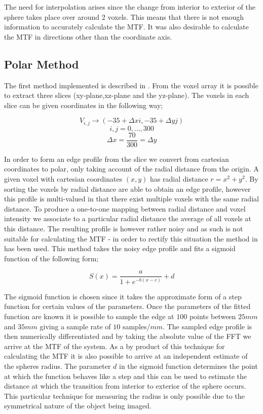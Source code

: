 \documentclass[
  twoside,
  11pt, a4paper,
  footinclude=true,
  headinclude=true,
  cleardoublepage=empty
]{scrbook}
\begin{document}
The need for interpolation arises since the change from interior to exterior of the sphere takes place over around 2 voxels. This means that there is not enough information to accurately calculate the MTF. It was also desirable to calculate the MTF in directions other than the coordinate axis.

\subsection{Polar Method}
The first method implemented is described in \cite{Friedman2013}. From the voxel array it is possible to extract three slices (xy-plane,xz-plane and the yz-plane). The voxels in each slice can be given coordinates in the following way;

\[
V_{i,j} \rightarrow (-35+\Delta x i,-35+\Delta y j)
\]
\[
i,j = 0,\dots,300
\]
\[
\Delta x = \frac{70}{300} = \Delta y
\]

In order to form an edge profile from the slice we convert from cartesian coordinates to polar, only taking account of the radial distance from the origin. A given voxel with cartesian coordinates $(x,y)$ has radial distance $r = x^2 + y^2$. By sorting the voxels by radial distance are able to obtain an edge profile, however this profile is multi-valued in that there exist multiple voxels with the same radial distance. To produce a one-to-one mapping between radial distance and voxel intensity we associate to a particular radial distance the average of all voxels at this distance. The resulting profile is however rather noisy and as such is not suitable for calculating the MTF - in order to rectify this situation the method in \cite{Takenaga2014} has been used. This method takes the noisy edge profile and fits a sigmoid function of the following form;

\[
S(x) = \frac{a}{1+e^{-b(x-c)}} + d
\]

The sigmoid function is chosen since it takes the approximate form of a step function for certain values of the parameters. Once the parameters of the fitted function are known it is possible to sample the edge at $100$ points between $25mm$ and $35mm$ giving a sample rate of $10$ samples/$mm$. The sampled edge profile is then numerically differentiated and by taking the absolute value of the FFT we arrive at the MTF of the system. As a by product of this technique for calculating the MTF it is also possible to arrive at an independent estimate of the spheres radius. The parameter $d$ in the sigmoid function determines the point at which the function behaves like a step and this can be used to estimate the distance at which the transition from interior to exterior of the sphere occurs. This particular technique for measuring the radius is only possible due to the symmetrical nature of the object being imaged.
\end{document}
